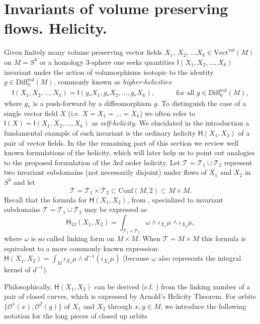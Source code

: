 \documentclass[12pt]{article}
\newcommand{\Cnf}{\text{Conf}}
\newcommand{\no}{\noindent}
\begin{document}
\no \section{Invariants of volume preserving flows. Helicity.}\label{sec:invariants-flows}

Given finitely many  volume preserving vector fields $X_1$, $X_2$, $\ldots X_k\in \text{Vect}^\text{vol}(M)$  on $M=S^3$ or a homology 3-sphere one seeks quantities $\mathsf{I}(X_1,X_2,\ldots,X_k)$ invariant under the action of volumorphisms isotopic to the identity $g\in \text{Diff}^\text{vol}_0(M)$, commonly known as \emph{higher-helicities}:
\begin{gather}\label{eq:invariants}
 \mathsf{I}(X_1,X_2,\ldots,X_k)=\mathsf{I}(g_\ast X_1,g_\ast X_2,\ldots,g_\ast X_k),\qquad\quad \text{for all }g\in \text{Diff}^\text{vol}_0(M), 
\end{gather}
where $g_\ast$ is a push-forward by a diffeomorphism $g$. To distinguish the case of a single vector field $X$ (i.e. $X=X_1=\ldots=X_k$) we often refer to $\mathsf{I}(X)=\mathsf{I}(X_1,X_2,\ldots,X_k)$ as \emph{self-helicity}. We elucidated in the introduction a fundamental example of such invariant is the ordinary helicity $\mathsf{H}(X_1,X_2)$ of a pair of vector fields. In the the remaining part of this section we review 
well known formulations of the helicity, which will later help us to point out analogies to the 
proposed formulation of the 3rd order helicity. Let $\mathcal{T}=\mathcal{T}_1\cup \mathcal{T}_2$ represent two invariant subdomains (not necessarily disjoint) under flows of $X_1$ and $X_2$ in $S^3$ and let 
\[
 \mathcal{T}=\mathcal{T}_1\times\mathcal{T}_2\subset \Cnf(M,2)\subset M\times M.
\]
Recall that the formula for $\mathsf{H}(X_1,X_2)$, from \cite{Khesin05, Vogel03}, specialized to invariant subdomains $\mathcal{T}=\mathcal{T}_1\cup \mathcal{T}_2$ may be expressed as 
\begin{equation}\label{eq:helicity}
 \mathsf{H}_{12}(X_1,X_2)=\int_{\mathcal{T}_1\times\mathcal{T}_2} \omega\wedge\iota_{X_1}\mu\wedge\iota_{X_2}\mu,
\end{equation}
where $\omega$ is so called linking form on $M\times M$. When $\mathcal{T}=M\times M$ this formula is equivalent to a more commonly known expression: $\mathsf{H}(X_1,X_2)=\int_M \iota_{X_1}\mu\wedge d^{-1}(\iota_{X_2}\mu)$ (because $\omega$ also represents the integral kernel of $d^{-1}$).

 Philosophically, $\mathsf{H}(X_1,X_2)$  can be derived (c.f. \cite{Arnold86}) from the linking number of a pair of closed curves, which is expressed by Arnold's Helicity Theorem. For orbits
 $\{\mathscr{O}^1(x),\mathscr{O}^2(y)\}$  of $X_1$ and $X_2$ through $x, y\in M$, we introduce the following notation for the long pieces of closed up orbits
 
\end{document}
